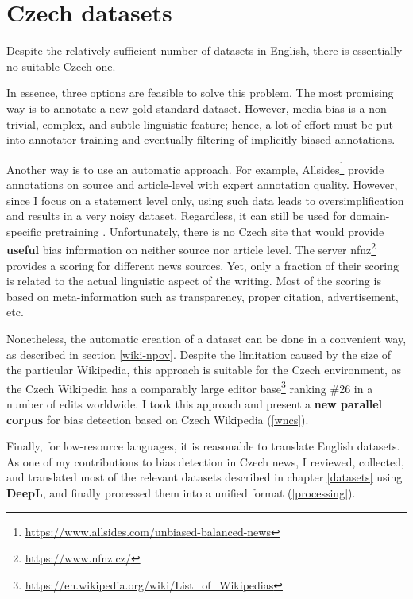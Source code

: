 \chapter{Czech datasets}
 Despite the relatively sufficient number of datasets in English, there is essentially no suitable Czech one.

 In essence, three options are feasible to solve this problem. The most promising way is to annotate a new gold-standard dataset. However, media bias is a non-trivial, complex, and subtle linguistic feature; hence, a lot of effort must be put into annotator training and eventually filtering of implicitly biased annotations.
 
 Another way is to use an automatic approach. For example, Allsides\footnote{\url{https://www.allsides.com/unbiased-balanced-news}} provide annotations on source and article-level with expert annotation quality. However, since I focus on a statement level only, using such data leads to oversimplification and results in a very noisy dataset. Regardless, it can still be used for domain-specific pretraining \cite{Spinde2021f}. Unfortunately, there is no Czech site that would provide \textbf{useful} bias information on neither source nor article level. The server \Gls{nfnz}\footnote{\url{https://www.nfnz.cz/}} provides a scoring for different news sources. Yet, only a fraction of their scoring is related to the actual linguistic aspect of the writing. Most of the scoring is based on meta-information such as transparency, proper citation, advertisement, etc.
 
 Nonetheless, the automatic creation of a dataset can be done in a convenient way, as described in section \ref{wiki-npov}. Despite the limitation caused by the size of the particular Wikipedia, this approach is suitable for the Czech environment, as the Czech Wikipedia has a comparably large editor base\footnote{ \url{https://en.wikipedia.org/wiki/List_of_Wikipedias}} ranking \#26 in a number of edits worldwide. I took this approach and present a \textbf{new parallel corpus} for bias detection based on Czech Wikipedia (\ref{wncs}).
 
 Finally, for low-resource languages, it is reasonable to translate English datasets. As one of my contributions to bias detection in Czech news, I reviewed, collected, and translated most of the relevant datasets described in chapter \ref{datasets} using \textbf{DeepL}, and finally processed them into a unified format (\ref{processing}).
 
 
 
